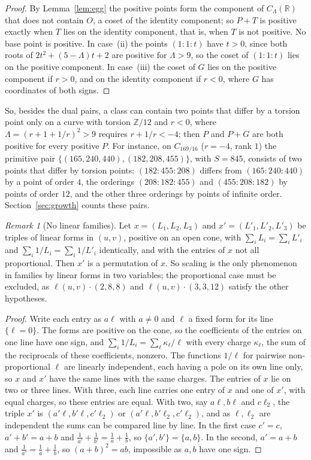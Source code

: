 \documentclass[11pt]{amsart}
\theoremstyle{definition}
\theoremstyle{remark}
\newtheorem{remark}[theorem]{Remark}
\newcommand{\R}{\mathbb{R}}
\newcommand{\Z}{\mathbb{Z}}
\begin{document}
\begin{proof}
By Lemma~\ref{lem:egg} the positive points form the component of $C_\Lambda(\R)$ that does not contain $O$, a coset of the identity component; so $P+T$ is positive exactly when $T$ lies on the identity component, that is, when $T$ is not positive. No base point is positive. In case~(ii) the points $(1:1:t)$ have $t>0$, since both roots of $2t^2+(5-\Lambda)t+2$ are positive for $\Lambda>9$, so the coset of $(1:1:t)$ lies on the positive component. In case~(iii) the coset of $G$ lies on the positive component if $r>0$, and on the identity component if $r<0$, where $G$ has coordinates of both signs.
\end{proof}

So, besides the dual pairs, a class can contain two points that differ by a torsion point only on a curve with torsion $\Z/12$ and $r<0$, where $\Lambda=(r+1+1/r)^2>9$ requires $r+1/r<-4$; then $P$ and $P+G$ are both positive for every positive $P$. For instance, on $C_{169/16}$ ($r=-4$, rank $1$) the primitive pair $\{(165,240,440),(182,208,455)\}$, with $S=845$, consists of two points that differ by torsion points: $(182:455:208)$ differs from $(165:240:440)$ by a point of order $4$, the orderings $(208:182:455)$ and $(455:208:182)$ by points of order $12$, and the other three orderings by points of infinite order. Section~\ref{sec:growth} counts these pairs.

\begin{remark}[No linear families]\label{rem:nolinear}
Let $x=(L_1,L_2,L_3)$ and $x'=(L'_1,L'_2,L'_3)$ be triples of linear forms in $(u,v)$, positive on an open cone, with $\sum_iL_i=\sum_iL'_i$ and $\sum_i1/L_i=\sum_i1/L'_i$ identically, and with the entries of $x$ not all proportional. Then $x'$ is a permutation of $x$. So scaling is the only phenomenon in families by linear forms in two variables; the proportional case must be excluded, as $\ell(u,v)\cdot(2,8,8)$ and $\ell(u,v)\cdot(3,3,12)$ satisfy the other hypotheses.
\end{remark}

\begin{proof}
Write each entry as $a\ell$ with $a\ne0$ and $\ell$ a fixed form for its line $\{\ell=0\}$. The forms are positive on the cone, so the coefficients of the entries on one line have one sign, and $\sum_i1/L_i=\sum_\ell\kappa_\ell/\ell$ with every charge $\kappa_\ell$, the sum of the reciprocals of these coefficients, nonzero. The functions $1/\ell$ for pairwise non-proportional $\ell$ are linearly independent, each having a pole on its own line only, so $x$ and $x'$ have the same lines with the same charges. The entries of $x$ lie on two or three lines. With three, each line carries one entry of $x$ and one of $x'$, with equal charges, so these entries are equal. With two, say $a\ell,b\ell$ and $c\ell_2$, the triple $x'$ is $(a'\ell,b'\ell,c'\ell_2)$ or $(a'\ell,b'\ell_2,c'\ell_2)$, and as $\ell,\ell_2$ are independent the sums can be compared line by line. In the first case $c'=c$, $a'+b'=a+b$ and $\frac1{a'}+\frac1{b'}=\frac1a+\frac1b$, so $\{a',b'\}=\{a,b\}$. In the second, $a'=a+b$ and $\frac1{a'}=\frac1a+\frac1b$, so $(a+b)^2=ab$, impossible as $a,b$ have one sign.
\end{proof}
\end{document}
